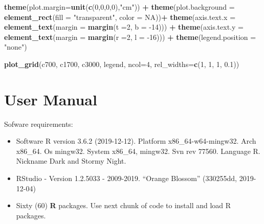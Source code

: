 \documentclass[12pt,oneside]{reedthesis}
\newenvironment{Shaded}{\begin{snugshade}}{\end{snugshade}}
\newcommand{\DataTypeTok}[1]{\textcolor[rgb]{0.13,0.29,0.53}{#1}}
\newcommand{\DecValTok}[1]{\textcolor[rgb]{0.00,0.00,0.81}{#1}}
\newcommand{\FloatTok}[1]{\textcolor[rgb]{0.00,0.00,0.81}{#1}}
\newcommand{\KeywordTok}[1]{\textcolor[rgb]{0.13,0.29,0.53}{\textbf{#1}}}
\newcommand{\NormalTok}[1]{#1}
\newcommand{\OperatorTok}[1]{\textcolor[rgb]{0.81,0.36,0.00}{\textbf{#1}}}
\newcommand{\OtherTok}[1]{\textcolor[rgb]{0.56,0.35,0.01}{#1}}
\newcommand{\StringTok}[1]{\textcolor[rgb]{0.31,0.60,0.02}{#1}}
\providecommand{\tightlist}{%
  \setlength{\itemsep}{0pt}\setlength{\parskip}{0pt}}
\begin{document}
\begin{Shaded}
\begin{Highlighting}[]
\StringTok{  }\KeywordTok{theme}\NormalTok{(}\DataTypeTok{plot.margin=}\KeywordTok{unit}\NormalTok{(}\KeywordTok{c}\NormalTok{(}\DecValTok{0}\NormalTok{,}\DecValTok{0}\NormalTok{,}\DecValTok{0}\NormalTok{,}\DecValTok{0}\NormalTok{),}\StringTok{"cm"}\NormalTok{)) }\OperatorTok{+}
\StringTok{  }\KeywordTok{theme}\NormalTok{(}\DataTypeTok{plot.background =} \KeywordTok{element_rect}\NormalTok{(}\DataTypeTok{fill =} \StringTok{"transparent"}\NormalTok{, }\DataTypeTok{color =} \OtherTok{NA}\NormalTok{))}\OperatorTok{+}
\StringTok{  }\KeywordTok{theme}\NormalTok{(}\DataTypeTok{axis.text.x =} \KeywordTok{element_text}\NormalTok{(}\DataTypeTok{margin =}  \KeywordTok{margin}\NormalTok{(}\DataTypeTok{t =}\DecValTok{2}\NormalTok{, }\DataTypeTok{b =} \DecValTok{-14}\NormalTok{))) }\OperatorTok{+}\StringTok{ }
\StringTok{  }\KeywordTok{theme}\NormalTok{(}\DataTypeTok{axis.text.y =} \KeywordTok{element_text}\NormalTok{(}\DataTypeTok{margin =}  \KeywordTok{margin}\NormalTok{(}\DataTypeTok{r =}\DecValTok{2}\NormalTok{, }\DataTypeTok{l =} \DecValTok{-16}\NormalTok{))) }\OperatorTok{+}
\StringTok{  }\KeywordTok{theme}\NormalTok{(}\DataTypeTok{legend.position =} \StringTok{"none"}\NormalTok{)}

\KeywordTok{plot_grid}\NormalTok{(c700, c1700, c3000, legend, }\DataTypeTok{ncol=}\DecValTok{4}\NormalTok{, }\DataTypeTok{rel_widths=}\KeywordTok{c}\NormalTok{(}\DecValTok{1}\NormalTok{, }\DecValTok{1}\NormalTok{, }\DecValTok{1}\NormalTok{, }\FloatTok{0.1}\NormalTok{))}
\end{Highlighting}
\end{Shaded}
\normalsize

\hypertarget{manual}{%
\chapter{User Manual}\label{manual}}

Sofware requirements:
\begin{itemize}
\tightlist
\item
  Software R version 3.6.2 (2019-12-12). Platform x86\_64-w64-mingw32. Arch x86\_64. Os mingw32. System x86\_64, mingw32. Svn rev 77560. Language R. Nickname Dark and Stormy Night.
\item
  RStudio - Version 1.2.5033 - 2009-2019. ``Orange Blossom'' (330255dd, 2019-12-04)
\item
  Sixty (60) \textbf{R} packages. Use next chunk of code to install and load R packages.
\end{itemize}
\tiny
\end{document}
